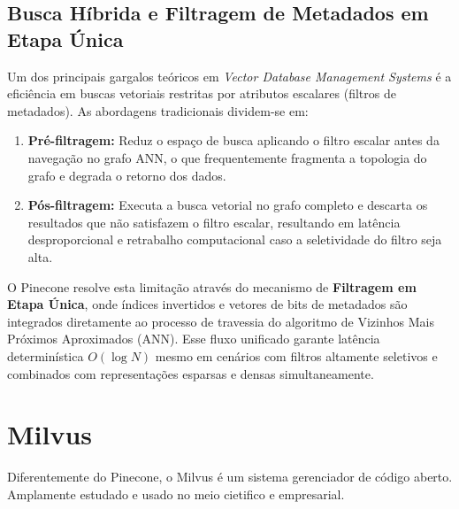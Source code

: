 \documentclass[a4paper, 12pt]{article} %
\begin{document}
\subsection{Busca Híbrida e Filtragem de Metadados em Etapa Única}
Um dos principais gargalos teóricos em \textit{Vector Database Management Systems} é a eficiência em buscas vetoriais restritas por atributos escalares (filtros de metadados). As abordagens tradicionais dividem-se em:
\begin{enumerate}
    \item \textbf{Pré-filtragem:} Reduz o espaço de busca aplicando o filtro escalar antes da navegação no grafo ANN, o que frequentemente fragmenta a topologia do grafo e degrada o retorno dos dados.
    \item \textbf{Pós-filtragem:} Executa a busca vetorial no grafo completo e descarta os resultados que não satisfazem o filtro escalar, resultando em latência desproporcional e retrabalho computacional caso a seletividade do filtro seja alta.
\end{enumerate}

O Pinecone resolve esta limitação através do mecanismo de \textbf{Filtragem em Etapa Única}, onde índices invertidos e vetores de bits de metadados são integrados diretamente ao processo de travessia do algoritmo de Vizinhos Mais Próximos Aproximados (ANN). Esse fluxo unificado garante latência determinística $O(\log N)$ mesmo em cenários com filtros altamente seletivos e combinados com representações esparsas e densas simultaneamente.

\section{ Milvus }
Diferentemente do Pinecone, o Milvus é um sistema gerenciador de código aberto. Amplamente estudado e usado no meio cietifico e empresarial.
\end{document}
